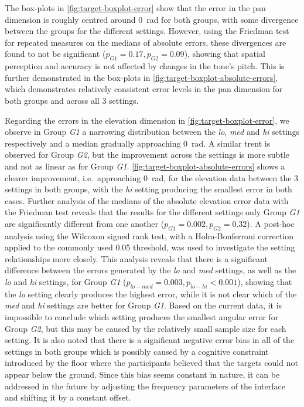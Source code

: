 \documentclass{article}
\begin{document}
The box-plots in \cref{fig:target-boxplot-error} show that the error in the pan dimension is roughly centred around \SI{0}{\radian} for both groups, with some divergence between the groups for the different settings.
However, using the Friedman test for repeated measures on the medians of absolute errors, these divergences are found to not be significant ($p_{G1} = 0.17, p_{G2} = 0.09$), showing that spatial perception and accuracy is not affected by changes in the tone's pitch.
This is further demonstrated in the box-plots in \cref{fig:target-boxplot-absolute-errors}, which demonstrates relatively consistent error levels in the pan dimension for both groups and across all 3 settings. 

Regarding the errors in the elevation dimension in \cref{fig:target-boxplot-error}, we observe in Group \textit{G1} a narrowing distribution between the \textit{lo}, \textit{med} and \textit{hi} settings respectively and a median gradually approaching \SI{0}{\radian}.
A similar trent is observed for Group \textit{G2}, but the improvement across the settings is more subtle and not as linear as for Group \textit{G1}.
\cref{fig:target-boxplot-absolute-errors} shows a clearer improvement, i.e.\ approaching \SI{0}{\radian}, for the elevation data between the 3 settings in both groups, with the \textit{hi} setting producing the smallest error in both cases.
Further analysis of the medians of the absolute elevation error data with the Friedman test reveals that the results for the different settings only Group \textit{G1} are significantly different from one another ($p_{G1} = 0.002, p_{G2} = 0.32$).
A post-hoc analysis using the Wilcoxon signed rank test, with a Holm-Bonferroni correction applied to the commonly used 0.05 threshold, was used to investigate the setting relationships more closely. 
This analysis reveals that there is a significant difference between the errors generated by the \textit{lo} and \textit{med} settings, as well as the \textit{lo} and \textit{hi} settings, for Group \textit{G1} ($p_{lo-med} = 0.003, p_{lo-hi} < 0.001$), showing that the \textit{lo} setting clearly produces the highest error, while it is not clear which of the \textit{med} and \textit{hi} settings are better for Group \textit{G1}. 
Based on the current data, it is impossible to conclude which setting produces the smallest angular error for Group \textit{G2}, but this may be caused by the relatively small sample size for each setting. 
It is also noted that there is a significant negative error bias in all of the settings in both groups which is possibly caused by a cognitive constraint introduced by the floor where the participants believed that the targets could not appear below the ground.
Since this bias seems constant in nature, it can be addressed in the future by adjusting the frequency parameters of the interface and shifting it by a constant offset. 
\end{document}
